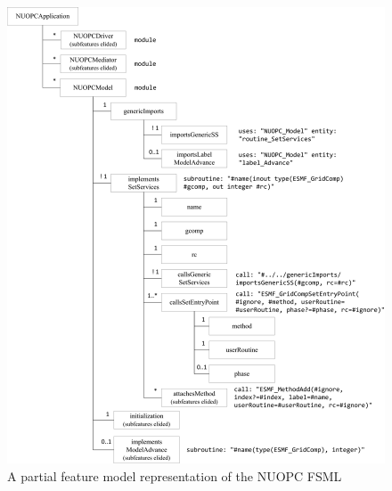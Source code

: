 \documentclass[oneside,11pt]{memoir}
\newcommand{\mapping}[1]{\texttt{\textit{#1}}}
\begin{document}

\begin{figure}
	\centering
	 \includegraphics[width=\textwidth]{figs/nuopcfm.png}
	\caption{A partial feature model representation of the NUOPC FSML}
	\label{fig:nuopcfm}
\end{figure}

\end{document}
